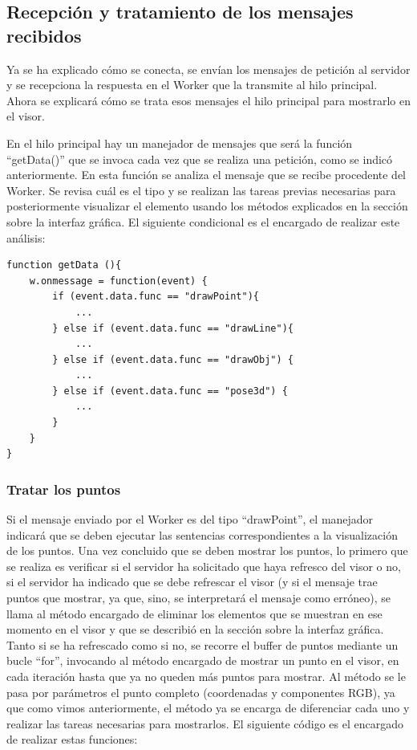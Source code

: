 \subsection{Recepción y tratamiento de los mensajes recibidos}
Ya se ha explicado cómo se conecta, se envían los mensajes de petición al servidor y se recepciona la respuesta en el Worker que la transmite al hilo principal. Ahora se explicará cómo se trata esos mensajes el hilo principal para mostrarlo en el visor.

En el hilo principal hay un manejador de mensajes que será la función ``getData()'' que se invoca cada vez que se realiza una petición, como se indicó anteriormente. En esta función se analiza el mensaje que se recibe procedente del Worker. Se revisa cuál es el tipo y se realizan las tareas previas necesarias para posteriormente visualizar el elemento usando los métodos explicados en la sección sobre la interfaz gráfica. El siguiente condicional es el encargado de realizar este análisis:

\begin{lstlisting}[frame=single]
function getData (){
	w.onmessage = function(event) {
		if (event.data.func == "drawPoint"){
			...
		} else if (event.data.func == "drawLine"){
			...
		} else if (event.data.func == "drawObj") {
			...
		} else if (event.data.func == "pose3d") {
			...
		}
	}
}
\end{lstlisting}

\subsubsection{Tratar los puntos}
Si el mensaje enviado por el Worker es del tipo ``drawPoint'', el manejador indicará que se deben ejecutar las sentencias correspondientes a la visualización de los puntos. Una vez concluido que se deben mostrar los puntos, lo primero que se realiza es verificar si el servidor ha solicitado que haya refresco del visor o no, si el servidor ha indicado 	que se debe refrescar el visor (y si el mensaje trae puntos que mostrar, ya que, sino, se interpretará el mensaje como erróneo), se llama al método encargado de eliminar los elementos que se muestran en ese momento en el visor y que se describió en la sección sobre la interfaz gráfica. Tanto si se ha refrescado como si no, se recorre el buffer de puntos mediante un bucle ``for'', invocando al método encargado de mostrar un punto en el visor, en cada iteración hasta que ya no queden más puntos para mostrar. Al método se le pasa por parámetros el punto completo (coordenadas y componentes RGB), ya que como vimos anteriormente, el método ya se encarga de diferenciar cada uno y realizar las tareas necesarias para mostrarlos. El siguiente código es el encargado de realizar estas funciones:

